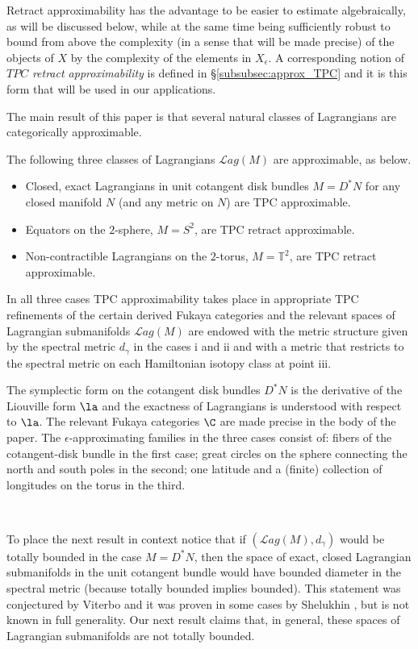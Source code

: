 Retract approximability has the advantage to be easier to estimate algebraically, as will be discussed below, while at the same time being sufficiently robust to bound from above the complexity (in a sense that will be made precise) of the objects of $X$ by the complexity of the elements in $X_{\epsilon}$. A corresponding notion of $TPC$ {\em retract approximability} is  defined  in \S\ref{subsubsec:approx_TPC} and it is this form that will be used in our applications.

The main result of this paper is that several natural classes of Lagrangians
are categorically approximable.

\begin{mainthm} \label{thmmain1} The following three classes of Lagrangians $\mathcal{L}ag(M)$ are approximable, as below.
\begin{itemize} 
\item[i.] Closed, exact Lagrangians in unit cotangent disk bundles $M=D^{\ast} N$ for any closed manifold $N$
(and any metric on $N$) are  TPC approximable.
\item[ii.] Equators on the $2$-sphere, $M=S^{2}$, are  TPC retract approximable.
\item[iii.] Non-contractible Lagrangians on the $2$-torus, $M=\mathbb{T}^{2}$, are  TPC retract approximable.
\end{itemize} 
In all three cases  TPC approximability takes place in appropriate TPC refinements of the 
certain derived Fukaya categories and the relevant spaces of Lagrangian submanifolds $\mathcal{L}ag(M)$ are endowed with the metric structure given by the spectral metric $d_{\gamma}$ in the cases i and ii and with a metric that restricts to the spectral metric on each Hamiltonian isotopy class at point iii. 
\end{mainthm}

The symplectic form on the cotangent disk bundles $D^{\ast}N$ is the derivative of the 
Liouville form $\la$ and the exactness of Lagrangians is understood with respect to $\la$.
The relevant Fukaya categories $\C$ are made precise in the body of the paper. The $\epsilon$-approximating families in the three cases consist of: fibers of the cotangent-disk bundle in the first case; great circles on the sphere connecting the north and south poles in the second; one latitude and a (finite) collection of longitudes on the torus in the third. 

\

To place the next result in context notice that if $(\mathcal{L}ag(M),d_{\gamma})$ would be totally bounded in the case $M=D^{\ast}N$, then the space of exact, closed Lagrangian submanifolds in the unit cotangent bundle would have bounded diameter in the spectral metric (because totally bounded implies bounded). This statement was conjectured by Viterbo and it was proven in some cases by Shelukhin  \cite{Shl:vit-2},\cite{Shl:vit-1}  but is not known in full generality. Our next result claims that, in general, these spaces of Lagrangian submanifolds are not totally bounded. 

